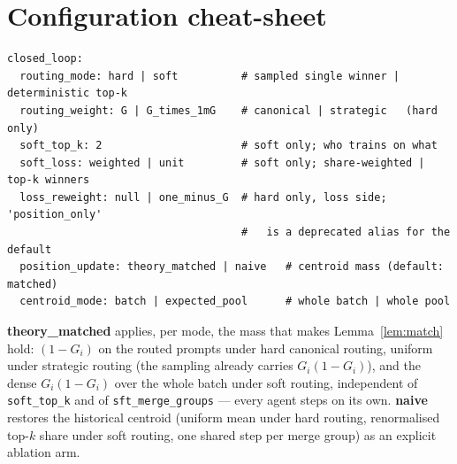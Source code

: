 \documentclass[11pt]{article}
\theoremstyle{remark}
\newcommand{\cfg}[1]{\texttt{#1}}
\begin{document}
\section{Configuration cheat-sheet}

\begin{verbatim}
closed_loop:
  routing_mode: hard | soft          # sampled single winner | deterministic top-k
  routing_weight: G | G_times_1mG    # canonical | strategic   (hard only)
  soft_top_k: 2                      # soft only; who trains on what
  soft_loss: weighted | unit         # soft only; share-weighted | top-k winners
  loss_reweight: null | one_minus_G  # hard only, loss side; 'position_only'
                                     #   is a deprecated alias for the default
  position_update: theory_matched | naive   # centroid mass (default: matched)
  centroid_mode: batch | expected_pool      # whole batch | whole pool
\end{verbatim}

\noindent\textbf{theory\_matched} applies, per mode, the mass that makes
Lemma~\ref{lem:match} hold: $(1-G_i)$ on the routed prompts under hard
canonical routing, uniform under strategic routing (the sampling already
carries $G_i(1-G_i)$), and the dense $G_i(1-G_i)$ over the whole batch under
soft routing, independent of \cfg{soft\_top\_k} and of
\cfg{sft\_merge\_groups} --- every agent steps on its own.
\textbf{naive} restores the historical centroid (uniform mean under hard
routing, renormalised top-$k$ share under soft routing, one shared step per
merge group) as an explicit ablation arm.
\end{document}
